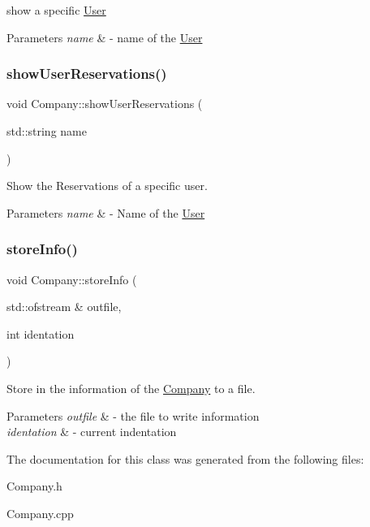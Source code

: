 show a specific \mbox{\hyperlink{class_user}{User}} 


\begin{DoxyParams}{Parameters}
{\em name} & -\/ name of the \mbox{\hyperlink{class_user}{User}} \\
\hline
\end{DoxyParams}
\mbox{\label{class_company_a428b70dbf9acd5edb34ee131ff1f8613}} 
\subsubsection{\texorpdfstring{show\+User\+Reservations()}{showUserReservations()}}
{\footnotesize\ttfamily void Company\+::show\+User\+Reservations (\begin{DoxyParamCaption}\item[{std\+::string}]{name }\end{DoxyParamCaption})}



Show the Reservations of a specific user. 


\begin{DoxyParams}{Parameters}
{\em name} & -\/ Name of the \mbox{\hyperlink{class_user}{User}} \\
\hline
\end{DoxyParams}
\mbox{\label{class_company_ac03f62f1accf21eb445a7aa5731b1199}} 
\subsubsection{\texorpdfstring{store\+Info()}{storeInfo()}}
{\footnotesize\ttfamily void Company\+::store\+Info (\begin{DoxyParamCaption}\item[{std\+::ofstream \&}]{outfile,  }\item[{int}]{identation }\end{DoxyParamCaption})}



Store in the information of the \mbox{\hyperlink{class_company}{Company}} to a file. 


\begin{DoxyParams}{Parameters}
{\em outfile} & -\/ the file to write information \\
\hline
{\em identation} & -\/ current indentation \\
\hline
\end{DoxyParams}


The documentation for this class was generated from the following files\+:\begin{DoxyCompactItemize}
\item 
Company.\+h\item 
Company.\+cpp\end{DoxyCompactItemize}
